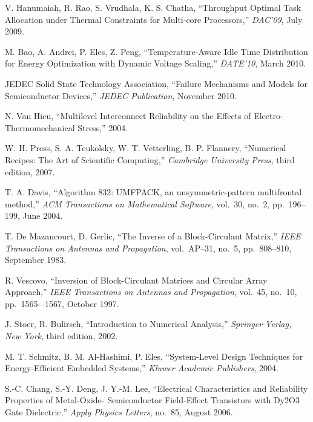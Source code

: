 \begin{thebibliography}{99}
    V. Hanumaiah, R. Rao, S. Vrudhala, K. S. Chatha,
    ``Throughput Optimal Task Allocation under Thermal Constraints for Multi-core Processors,''
    \emph{DAC'09},
    July 2009.

    M. Bao, A. Andrei, P. Eles, Z. Peng,
    ``Temperature-Aware Idle Time Distribution for Energy Optimization with Dynamic Voltage Scaling,''
    \emph{DATE'10},
    March 2010.

    JEDEC Solid State Technology Association,
    ``Failure Mechanisms and Models for Semiconductor Devices,''
    \emph{JEDEC Publication},
    November 2010.

    N. Van Hieu,
    ``Multilevel Interconnect Reliability on the Effects of Electro-Thermomechanical Stress,''
    2004.

    W. H. Press, S. A. Teukolsky, W. T. Vetterling, B. P. Flannery,
    ``Numerical Recipes: The Art of Scientific Computing,''
    \emph{Cambridge University Press},
    third edition, 2007.

    T. A. Davis,
    ``Algorithm 832: UMFPACK, an unsymmetric-pattern multifrontal method,''
    \emph{ACM Transactions on Mathematical Software},
    vol.~30, no.~2, pp.~196--199, June 2004.

    T. De Mazancourt, D. Gerlic,
    ``The Inverse of a Block-Circulant Matrix,''
    \emph{IEEE Transactions on Antennas and Propagation},
    vol.~AP–31, no.~5, pp.~808–810, September 1983.

    R. Vescovo,
    ``Inversion of Block-Circulant Matrices and Circular Array Approach,''
    \emph{IEEE Transactions on Antennas and Propagation},
    vol.~45, no.~10, pp.~1565-–1567, October 1997.

    J. Stoer, R. Bulirsch,
    ``Introduction to Numerical Analysis,''
    \emph{Springer-Verlag, New York},
    third edition, 2002.

    M. T. Schmitz, B. M. Al-Hashimi, P. Eles,
    ``System-Level Design Techniques for Energy-Efficient Embedded Systems,''
    \emph{Kluwer Academic Publishers},
    2004.

    S.-C. Chang, S.-Y. Deng, J. Y.-M. Lee,
    ``Electrical Characteristics and Reliability Properties of Metal-Oxide- Semiconductor Field-Effect Transistors with Dy2O3 Gate Dielectric,''
    \emph{Apply Physics Letters},
    no.~85, August 2006.


\end{thebibliography}
